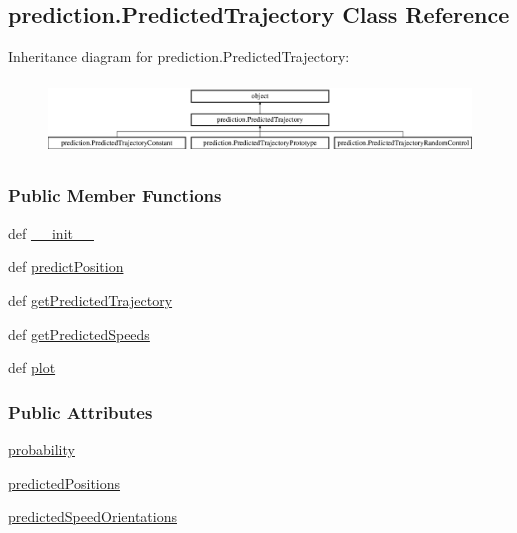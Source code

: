 \hypertarget{classprediction_1_1PredictedTrajectory}{\subsection{prediction.\-Predicted\-Trajectory Class Reference}
\label{classprediction_1_1PredictedTrajectory}
}
Inheritance diagram for prediction.\-Predicted\-Trajectory\-:\begin{figure}[H]
\begin{center}
\leavevmode
\includegraphics[height=2.014389cm]{classprediction_1_1PredictedTrajectory}
\end{center}
\end{figure}
\subsubsection*{Public Member Functions}
\begin{DoxyCompactItemize}
\item 
def \hyperlink{classprediction_1_1PredictedTrajectory_a74f7b7352274ba7694e4a9b76b68d653}{\-\_\-\-\_\-init\-\_\-\-\_\-}
\item 
def \hyperlink{classprediction_1_1PredictedTrajectory_a09f428bb05bd24b2e801d60634ae77a6}{predict\-Position}
\item 
def \hyperlink{classprediction_1_1PredictedTrajectory_adf34e5a664f07522310b049f452ce23c}{get\-Predicted\-Trajectory}
\item 
def \hyperlink{classprediction_1_1PredictedTrajectory_a17a313a577cb91c128a4c07f5df45115}{get\-Predicted\-Speeds}
\item 
def \hyperlink{classprediction_1_1PredictedTrajectory_a407d4824af1ecef642afaa797ded04d3}{plot}
\end{DoxyCompactItemize}
\subsubsection*{Public Attributes}
\begin{DoxyCompactItemize}
\item 
\hyperlink{classprediction_1_1PredictedTrajectory_a6f9fdfc40bf0256bf4b1574aebef5819}{probability}
\item 
\hyperlink{classprediction_1_1PredictedTrajectory_aab0c8a175ad11b867c58a3537d1968a4}{predicted\-Positions}
\item 
\hyperlink{classprediction_1_1PredictedTrajectory_aa190da0abcda7865e5d5dfbe9ba162b5}{predicted\-Speed\-Orientations}
\end{DoxyCompactItemize}


